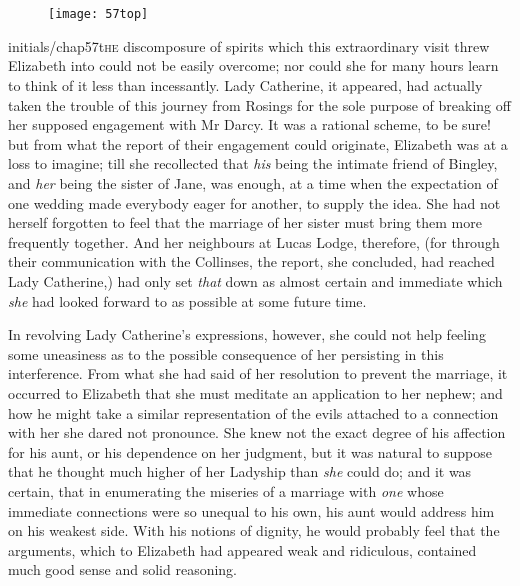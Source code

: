 \chapter[Chapter \thechapter]{}
	
\begin{figure}[t!]
\centering
\texttt{[image: 57top]}
\end{figure}


\lettrine[lines=6,image=true]{initials/chap57t}{he}  discomposure of spirits which this extraordinary visit threw Elizabeth into could not be easily overcome; nor could she for many hours learn to think of it less than incessantly. Lady Catherine, it appeared, had actually taken the trouble of this journey from Rosings for the sole purpose of breaking off her supposed engagement with Mr Darcy. It was a rational scheme, to be sure! but from what the report of their engagement could originate, Elizabeth was at a loss to imagine; till she recollected that \textit{his} being the intimate friend of Bingley, and \textit{her} being the sister of Jane, was enough, at a time when the expectation of one wedding made everybody eager for another, to supply the idea. She had not herself forgotten to feel that the marriage of her sister must bring them more frequently together. And her neighbours at Lucas Lodge, therefore, (for through their communication with the Collinses, the report, she concluded, had reached Lady Catherine,) had only set \textit{that} down as almost certain and immediate which \textit{she} had looked forward to as possible at some future time.

In revolving Lady Catherine's expressions, however, she could not help feeling some uneasiness as to the possible consequence of her persisting in this interference. From what she had said of her resolution to prevent the marriage, it occurred to Elizabeth that she must meditate an application to her nephew; and how he might take a similar representation of the evils attached to a connection with her she dared not pronounce. She knew not the exact degree of his affection for his aunt, or his dependence on her judgment, but it was natural to suppose that he thought much higher of her Ladyship than \textit{she} could do; and it was certain, that in enumerating the miseries of a marriage with \textit{one} whose immediate connections were so unequal to his own, his aunt would address him on his weakest side. With his notions of dignity, he would probably feel that the arguments, which to Elizabeth had appeared weak and ridiculous, contained much good sense and solid reasoning.

